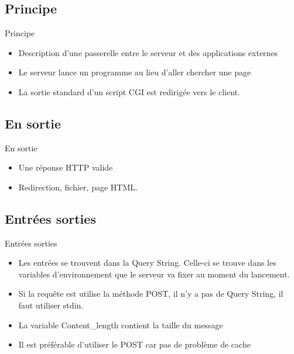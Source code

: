 \section{\sectitle}
\begin{frame}{\sectitle}
    \def\subsectitle{Principe}
    \subsection{\subsectitle}
    \begin{block}{\subsectitle}
        \begin{itemize}
            \item Description d'une passerelle entre le serveur et des
                applications externes
            \item Le serveur lance un programme au lieu d'aller chercher une
                page
            \item La sortie standard d'un script CGI est redirigée vers le
                client.
        \end{itemize}
    \end{block}
    \def\subsectitle{En sortie}
    \subsection{\subsectitle}
    \begin{block}{\subsectitle}
        \begin{itemize}
            \item Une réponse HTTP valide
            \item Redirection, fichier, page HTML.
        \end{itemize}
    \end{block}
\end{frame}

\begin{frame}{\sectitle}
    \def\subsectitle{Entrées sorties}
    \subsection{\subsectitle}
    \begin{block}{\subsectitle}
        \begin{itemize}
            \item Les entrées se trouvent dans la Query String. Celle-ci se
                trouve dans les variables d'environnement que le serveur va
                fixer au moment du lancement.
            \item Si la requête est utilise la méthode POST, il n'y a pas de
                Query String, il faut utiliser stdin.
            \item La variable Content\_length contient la taille du message
            \item Il est préférable d'utiliser le POST car pas de problème de
                cache
        \end{itemize}
    \end{block}
\end{frame}

